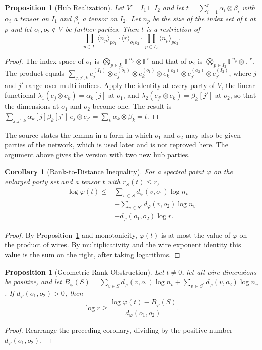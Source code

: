\documentclass[11pt,letterpaper]{report}
\theoremstyle{plain}
\newtheorem{proposition}[theorem]{Proposition}
\newtheorem{corollary}[theorem]{Corollary}
\theoremstyle{definition}
\theoremstyle{remark}
\begin{document}
\begin{proposition}[Hub Realization]\label{inh:hub}
Let $V=I_1\sqcup I_2$ and let $t=\sum_{i=1}^{r}\alpha_i\otimes\beta_i$ with $\alpha_i$ a tensor on $I_1$ and $\beta_i$ a tensor on $I_2$. Let $n_p$ be the size of the index set of $t$ at $p$ and let $o_1,o_2\notin V$ be further parties. Then $t$ is a restriction of
\[
\prod_{p\in I_1}\langle n_p\rangle_{po_1}\cdot\langle r\rangle_{o_1o_2}\cdot\prod_{p\in I_2}\langle n_p\rangle_{po_2}.
\]
\end{proposition}
\begin{proof}
The index space of $o_1$ is $\bigotimes_{p\in I_1}\mathbb F^{n_p}\otimes\mathbb F^{r}$ and that of $o_2$ is $\bigotimes_{p\in I_2}\mathbb F^{n_p}\otimes\mathbb F^{r}$. The product equals $\sum_{j,j',k}e_j^{(I_1)}\otimes e_j^{(o_1)}\otimes e_k^{(o_1)}\otimes e_k^{(o_2)}\otimes e_{j'}^{(o_2)}\otimes e_{j'}^{(I_2)}$, where $j$ and $j'$ range over multi-indices. Apply the identity at every party of $V$, the linear functional $\lambda_1(e_j\otimes e_k)=\alpha_k[j]$ at $o_1$, and $\lambda_2(e_{j'}\otimes e_k)=\beta_k[j']$ at $o_2$, so that the dimensions at $o_1$ and $o_2$ become one. The result is $\sum_{j,j',k}\alpha_k[j]\beta_k[j']\,e_j\otimes e_{j'}=\sum_k\alpha_k\otimes\beta_k=t$.
\end{proof}

The source states the lemma in a form in which $o_1$ and $o_2$ may also be given parties of the network, which is used later and is not reproved here. The argument above gives the version with two new hub parties.

\begin{corollary}[Rank-to-Distance Inequality]
For a spectral point $\varphi$ on the enlarged party set and a tensor $t$ with $r_S(t)\le r$,
\[
\begin{aligned}
\log\varphi(t)\le{}&\sum_{v\in S}d_\varphi(v,o_1)\log n_v\\
&+\sum_{v\in S^c}d_\varphi(v,o_2)\log n_v\\
&+d_\varphi(o_1,o_2)\log r.
\end{aligned}
\]
\end{corollary}
\begin{proof}
By Proposition~\ref{inh:hub} and monotonicity, $\varphi(t)$ is at most the value of $\varphi$ on the product of wires. By multiplicativity and the wire exponent identity this value is the sum on the right, after taking logarithms.
\end{proof}

\begin{proposition}[Geometric Rank Obstruction]
Let $t\ne0$, let all wire dimensions be positive, and let $B_\varphi(S)=\sum_{v\in S}d_\varphi(v,o_1)\log n_v+\sum_{v\in S^c}d_\varphi(v,o_2)\log n_v$. If $d_\varphi(o_1,o_2)>0$, then
\[
\log r\ge\frac{\log\varphi(t)-B_\varphi(S)}{d_\varphi(o_1,o_2)}.
\]
\end{proposition}
\begin{proof}
Rearrange the preceding corollary, dividing by the positive number $d_\varphi(o_1,o_2)$.
\end{proof}
\end{document}
